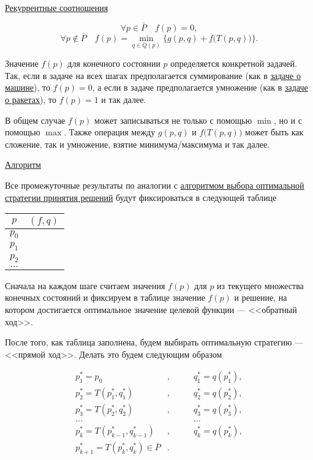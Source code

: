 \bigskip

\underline{Рекуррентные соотношения}

\[
\forall p \in \bar{P} \quad f(p) = 0,
\]
\[
\forall p \notin \bar{P} \quad f(p) = \min_{q \in Q(p)} \Big\{ g(p, q) + f\big(T(p, q)\big) \Big\}.
\]

\begin{note}
	Значение $f(p)$ для конечного состоянии $p$ определяется конкретной задачей. Так, если в задаче на всех шагах предполагается суммирование (как в \hyperref[pr:car_on_island]{задаче о машине}), то $f(p) = 0$, а если в задаче предполагается умножение (как в  \hyperref[pr:rockets]{задаче о ракетах}), то $f(p) = 1$ и так далее.
\end{note}

\begin{note}
	В общем случае $f(p)$ может записываться не только с помощью $\min$, но и с помощью $\max$. Также операция между $g(p, q)$ и $f\big(T(p, q)\big)$ может быть как сложение, так и умножение, взятие минимума/максимума и так далее.
\end{note}

\bigskip

\underline{Алгоритм}

Все промежуточные результаты по аналогии с \hyperref[alg:opt_strategy]{алгоритмом выбора оптимальной стратегии принятия решений} будут фиксироваться в следующей таблице

\begin{table}[H]
	\centering
	\begin{tabular}{ | c | c | } 
		\hline
		$p$ & $(f, q)$ \\ 
		\hline
		$p_0$ & \\\hline
		$p_1$ & \\\hline
		$p_2$ & \\\hline
		$\dots$ & \\\hline
	\end{tabular}
\end{table}

Сначала на каждом шаге считаем значения $f(p)$ для $p$ из текущего множества конечных состояний и фиксируем в таблице значение $f(p)$ и решение, на котором достигается оптимальное значение целевой функции --- <<обратный ход>>.

После того, как таблица заполнена, будем выбирать оптимальную стратегию --- <<прямой ход>>. Делать это будем следующим образом

\begin{align*}
	p_1^* = p_0&, \qquad &q_1^* = q(p_1^*), \\
	p_2^* = T(p_1^*, q_1^*)&, &q_2^* = q(p_2^*), \\
	p_3^* = T(p_2^*, q_2^*)&, &q_3^* = q(p_3^*), \\
	\dots& &\dots \\
	p_k^* = T(p_{k-1}^*, q_{k-1}^*)&, &q_k^* = q(p_k^*), \\
	p_{k+1}^* = T(p_{k}^*, q_{k}^*) \in \bar{P}&.
\end{align*}

